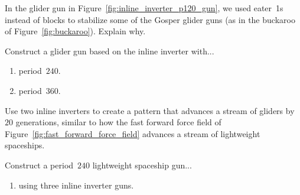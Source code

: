 \vspace*{-0.4cm}\hrulefill\vspace*{-0.3cm}\footnotesize\begin{multicols}{2}\vspace*{-0.4cm}\raggedcolumns{}
\setlength{\parskip}{0pt}
	
	
	\begin{problemstar}\label{exer:inline_inverter_gun_why_buckaroo} 
		In the glider gun in Figure~\ref{fig:inline_inverter_p120_gun}, we used eater~1s instead of blocks to stabilize some of the Gosper glider guns (as in the buckaroo of Figure~\ref{fig:buckaroo}). Explain why.
	\end{problemstar}
	
	
	\mfilbreak
	
	
	\begin{problem}\label{exer:inline_inverter_gun_high_period} 
		Construct a glider gun based on the inline inverter with...\smallskip
		
		\begin{enumerate}[label=\bf\color{ocre}(\alph*)]
			\item period~$240$.
			
			\item period~$360$.
		\end{enumerate}
	\end{problem}
	
	
	\mfilbreak
	
	
	\begin{problem}\label{exer:inline_inverter_advancer} 
		Use two inline inverters to create a pattern that advances a stream of gliders by $20$ generations, similar to how the fast forward force field of Figure~\ref{fig:fast_forward_force_field} advances a stream of lightweight spaceships.
	\end{problem}
	
	
	\mfilbreak
	
	
	\begin{problem}\label{exer:inline_inverter_lwss_gun} 
		Construct a period~$240$ lightweight spaceship gun...\smallskip
		
		\begin{enumerate}[label=\bf\color{ocre}(\alph*)]
			\item using three inline inverter guns.
			

\end{enumerate}
\end{problem}
\end{multicols}
